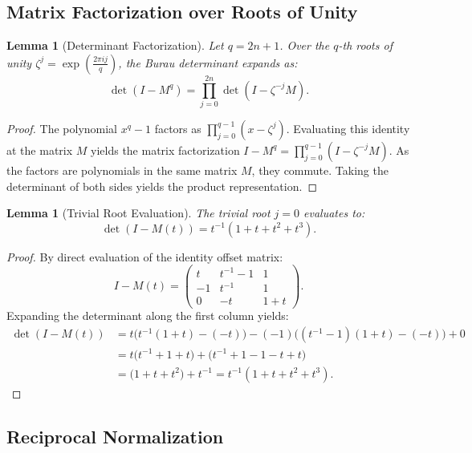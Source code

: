 \documentclass[11pt]{article}
\newtheorem{lemma}[theorem]{Lemma}
\begin{document}
\subsection{Matrix Factorization over Roots of Unity}

\begin{lemma}[Determinant Factorization]\label{lem:det_fact}
Let $q = 2n+1$. Over the $q$-th roots of unity $\zeta^j = \exp\left(\frac{2\pi i j}{q}\right)$, the Burau determinant expands as:
\begin{equation}
\det(I - M^q) = \prod_{j=0}^{2n} \det(I - \zeta^{-j} M).
\end{equation}
\end{lemma}

\begin{proof}
The polynomial $x^q - 1$ factors as $\prod_{j=0}^{q-1} (x - \zeta^j)$. Evaluating this identity at the matrix $M$ yields the matrix factorization $I - M^q = \prod_{j=0}^{q-1} (I - \zeta^{-j} M)$. As the factors are polynomials in the same matrix $M$, they commute. Taking the determinant of both sides yields the product representation.
\end{proof}

\begin{lemma}[Trivial Root Evaluation]\label{lem:trivial_root}
The trivial root $j=0$ evaluates to:
\[ \det(I - M(t)) = t^{-1}(1 + t + t^2 + t^3). \]
\end{lemma}
\begin{proof}
By direct evaluation of the identity offset matrix:
\begin{equation*}
I - M(t) = \begin{pmatrix} t & t^{-1}-1 & 1 \\ -1 & t^{-1} & 1 \\ 0 & -t & 1+t \end{pmatrix}.
\end{equation*}
Expanding the determinant along the first column yields:
\begin{align*}
\det(I-M(t)) &= t \big( t^{-1}(1+t) - (-t) \big) - (-1) \big( (t^{-1}-1)(1+t) - (-t) \big) + 0 \\
&= t \big( t^{-1} + 1 + t \big) + \big( t^{-1} + 1 - 1 - t + t \big) \\
&= \big( 1 + t + t^2 \big) + t^{-1} = t^{-1}(1 + t + t^2 + t^3).
\end{align*}
\end{proof}

\subsection{Reciprocal Normalization}
\end{document}
